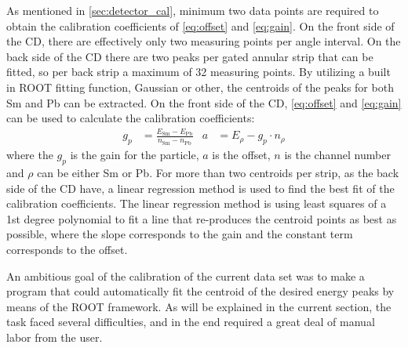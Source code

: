 \documentclass[twoside,english]{uiofysmaster/uiofysmaster}
\let\orgautoref\autoref
\renewcommand{\autoref}
        {%
		 \def\sectionautorefname{Section}%
		 \def\subsectionautorefname{Section}%
		 \def\subsubsectionautorefname{Section}%
		 \def\chapterautorefname{Chapter}%
          \orgautoref}
\begin{document}
As mentioned in \autoref{sec:detector_cal}, minimum two data points are required to obtain the calibration coefficients of \autoref{eq:offset} and \autoref{eq:gain}.
On the front side of the CD, there are effectively only two measuring points per angle interval. 
On the back side of the CD there are two peaks per gated annular strip that can be fitted, so per back strip a maximum of 32 measuring points. 
By utilizing a built in ROOT fitting function, Gaussian or other, the centroids of the peaks for both Sm and Pb can be extracted. 
On the front side of the CD, \autoref{eq:offset} and \autoref{eq:gain} can be used to calculate the calibration coefficients:
\begin{align}\label{eq:GPandA}
	g_p &= \frac{E_{\text{Sm}} - E_{\text{Pb}}}{n_{\text{Sm}} - n_{\text{Pb}}} 
	&  
	a &= E_{\rho} - g_p \cdot n_{\rho}
\end{align}
where the $g_p$ is the gain for the particle, $a$ is the offset, $n$ is the channel number and $\rho$ can be either Sm or Pb.
For more than two centroids per strip, as the back side of the CD have, a linear regression method is used to find the best fit of the calibration coefficients.
The linear regression method is using least squares of a 1st degree polynomial \cite{Polyfit} to fit a line that re-produces the centroid points as best as possible, where the slope corresponds to the gain and the constant term corresponds to the offset.

An ambitious goal of the calibration of the current data set was to make a program that could automatically fit the centroid of the desired energy peaks by means of the ROOT framework. 
As will be explained in the current section, the task faced several difficulties, and in the end required a great deal of manual labor from the user.
\end{document}
